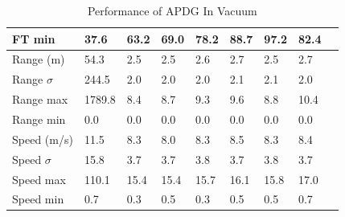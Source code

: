 \begin{table}[H]
\begin{tabularx}{\textwidth}{@{}lYYYYYYYY@{}}
		FT min & 37.6 & 63.2 & 69.0 & 78.2 & 88.7 & 97.2 & 82.4 \\                       
		\toprule                                                                           
		Range (m) & 54.3 & 2.5 & 2.5 & 2.6 & 2.7 & 2.5 & 2.7 \\                          
                                                                         
		Range $\sigma$ & 244.5 & 2.0 & 2.0 & 2.0 & 2.1 & 2.1 & 2.0 \\                    
                                                                          
		Range max & 1789.8 & 8.4 & 8.7 & 9.3 & 9.6 & 8.8 & 10.4 \\                       
                                                                        
		Range min & 0.0 & 0.0 & 0.0 & 0.0 & 0.0 & 0.0 & 0.0 \\                           
		\toprule                                                                           
		Speed (m/s) & 11.5 & 8.3 & 8.0 & 8.3 & 8.5 & 8.3 & 8.4 \\                        
                                                                         
		Speed $\sigma$ & 15.8 & 3.7 & 3.7 & 3.8 & 3.7 & 3.8 & 3.7 \\                     
                                                                        
		Speed max & 110.1 & 15.4 & 15.4 & 15.7 & 16.1 & 15.8 & 17.0 \\                   
                                                                        
		Speed min & 0.7 & 0.3 & 0.5 & 0.3 & 0.5 & 0.5 & 0.7 \\                           
		\bottomrule                                                                           
	\end{tabularx}                                                                    
	\caption{Performance of APDG In Vacuum}                                          
	\label{tab:disppowvac}                                                     
\end{table}  


